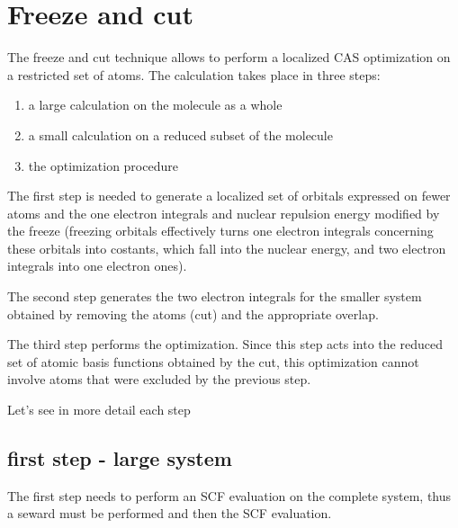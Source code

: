 \documentclass[11pt,a4paper]{article}
\begin{document}
\section{Freeze and cut}

The freeze and cut technique allows to perform a localized CAS optimization on
a restricted set of atoms.
The calculation takes place in three steps:

\begin{enumerate}
\item a large calculation on the molecule as a whole
\item a small calculation on a reduced subset of the molecule
\item the optimization procedure
\end{enumerate}

The first step is needed to generate a localized set of orbitals expressed
on fewer atoms and the one electron integrals and nuclear repulsion energy
modified by the freeze (freezing orbitals effectively turns one electron
integrals concerning these orbitals into costants, which fall into the
nuclear energy, and two electron integrals into one electron ones).

The second step generates the two electron integrals for the smaller system
obtained by removing the atoms (cut) and the appropriate overlap.

The third step performs the optimization. Since this step acts into the
reduced set of atomic basis functions obtained by the cut, this optimization
cannot involve atoms that were excluded by the previous step.


Let's see in more detail each step

\subsection{first step - large system}

The first step needs to perform an SCF evaluation on the complete system,
thus a seward must be performed and then the SCF evaluation.
\end{document}
